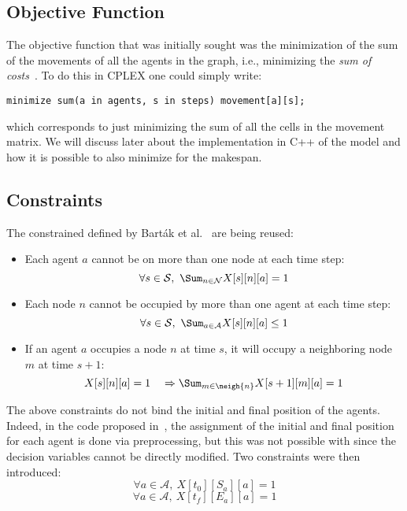 \subsection{Objective Function}
The objective function that was initially sought was the minimization of the 
sum of the movements of all the agents in the graph, i.e., minimizing the 
\textit{sum of costs}~\cite{picat1}. To do this in CPLEX one could simply 
write:
\begin{verbatim}
minimize sum(a in agents, s in steps) movement[a][s];
\end{verbatim}
which corresponds to just minimizing the sum of all the cells in the movement
matrix. We will discuss later about the implementation in C++ of the model and
how it is possible to also minimize for the makespan. 
%
%
\subsection{Constraints}
The constrained defined by Bart\'{a}k et al.~\cite{picat1} are being reused:
\begin{itemize}
  \item Each agent $a$ cannot be on more than one node at each time step:
    \begin{equation}
      \forall s \in \mathcal{S},~\Sum_{n \in \mathcal{N}} X[s][n][a]=1
      \label{eq:picat1_one_agent_one_node}
    \end{equation}
  \item Each node $n$ cannot be occupied by more than one agent at each time
    step:
    \begin{equation}
      \forall s \in \mathcal{S},~\Sum_{a \in \mathcal{A}} X[s][n][a]\leq 1
      \label{eq:picat1_one_node_one_agent}
    \end{equation}
  \item If an agent $a$ occupies a node $n$ at time $s$, it will occupy a
    neighboring node $m$ at time $s+1$:
    \begin{equation}
      X[s][n][a]=1 \quad \Rightarrow \Sum_{m\in \neigh{n}} X[s+1][m][a]=1
      \label{eq:picat1_move_to_neigh}
    \end{equation}
\end{itemize}
The above constraints do not bind the initial and final position of the
agents. Indeed, in the code proposed in~\cite{picat1}, the assignment of
the initial and final position for each agent is done via preprocessing,
but this was not possible with \OPL since the decision variables cannot be
directly modified. Two constraints were then introduced:
\begin{equation}
  \forall a \in \mathcal{A},~X[t_0][S_a][a] = 1
  \label{eq:cplex_init_pos}
\end{equation}
\begin{equation}
  \forall a \in \mathcal{A},~X[t_f][E_a][a] = 1
  \label{eq:cplex_final_pos}
\end{equation}
%
